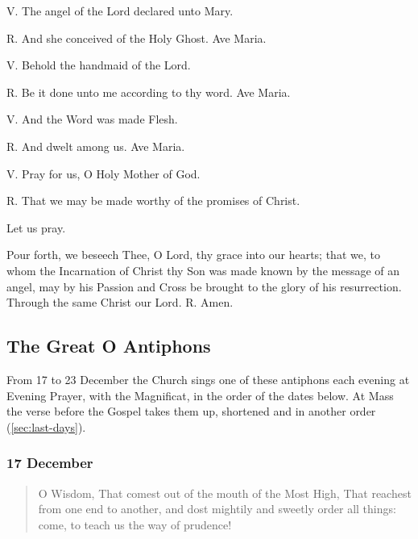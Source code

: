 \noindent V. The angel of the Lord declared unto Mary.\par
\noindent R. And she conceived of the Holy Ghost. Ave Maria.\par
\noindent V. Behold the handmaid of the Lord.\par
\noindent R. Be it done unto me according to thy word. Ave Maria.\par
\noindent V. And the Word was made Flesh.\par
\noindent R. And dwelt among us. Ave Maria.\par
\noindent V. Pray for us, O Holy Mother of God.\par
\noindent R. That we may be made worthy of the promises of Christ.\par
\noindent Let us pray.\par
\noindent Pour forth, we beseech Thee, O Lord, thy grace into our hearts; that we, to whom the Incarnation of Christ thy Son was made known by the message of an angel, may by his Passion and Cross be brought to the glory of his resurrection. Through the same Christ our Lord. R. Amen.\par

\subsection{The Great O Antiphons}

From 17 to 23 December the Church sings one of these antiphons each evening
at Evening Prayer, with the Magnificat, in the order of the dates below. At
Mass the verse before the Gospel takes them up, shortened and in another order
(\ref{sec:last-days}).

\subsubsection*{17 December}

\begin{quote}
\par
\end{quote}

\begin{quote}
O Wisdom, That comest out of the mouth of the Most High, That reachest from one end to another, and dost mightily and sweetly order all things: come, to teach us the way of prudence!\par
\end{quote}

